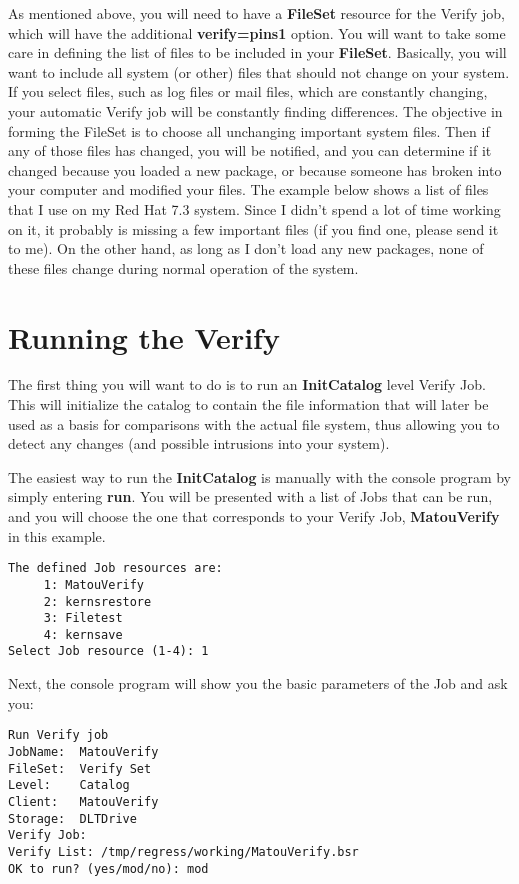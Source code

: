 As mentioned above, you will need to have a {\bf FileSet} resource for the
Verify job, which will have the additional {\bf verify=pins1} option. You will
want to take some care in defining the list of files to be included in your
{\bf FileSet}. Basically, you will want to include all system (or other) files
that should not change on your system. If you select files, such as log files
or mail files, which are constantly changing, your automatic Verify job will
be constantly finding differences. The objective in forming the FileSet is to
choose all unchanging important system files. Then if any of those files has
changed, you will be notified, and you can determine if it changed because you
loaded a new package, or because someone has broken into your computer and
modified your files. The example below shows a list of files that I use on my
Red Hat 7.3 system. Since I didn't spend a lot of time working on it, it
probably is missing a few important files (if you find one, please send it to
me). On the other hand, as long as I don't load any new packages, none of
these files change during normal operation of the system. 

\section{Running the Verify}

The first thing you will want to do is to run an {\bf InitCatalog} level
Verify Job. This will initialize the catalog to contain the file information
that will later be used as a basis for comparisons with the actual file
system, thus allowing you to detect any changes (and possible intrusions into
your system). 

The easiest way to run the {\bf InitCatalog} is manually with the console
program by simply entering {\bf run}. You will be presented with a list of
Jobs that can be run, and you will choose the one that corresponds to your
Verify Job, {\bf MatouVerify} in this example. 

\footnotesize
\begin{verbatim}
The defined Job resources are:
     1: MatouVerify
     2: kernsrestore
     3: Filetest
     4: kernsave
Select Job resource (1-4): 1
\end{verbatim}
\normalsize

Next, the console program will show you the basic parameters of the Job and
ask you: 

\footnotesize
\begin{verbatim}
Run Verify job
JobName:  MatouVerify
FileSet:  Verify Set
Level:    Catalog
Client:   MatouVerify
Storage:  DLTDrive
Verify Job:  
Verify List: /tmp/regress/working/MatouVerify.bsr
OK to run? (yes/mod/no): mod
\end{verbatim}
\normalsize

